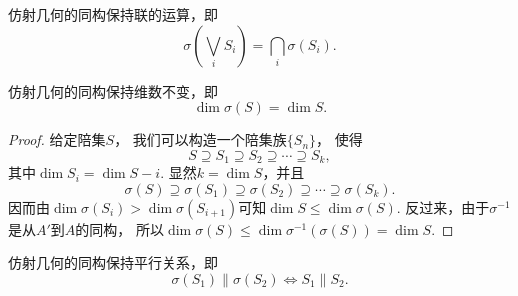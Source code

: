 \begin{property}
仿射几何的同构保持联的运算，即\begin{equation*}
	\sigma\left( \bigvee_i S_i \right)
	= \bigcap_i \sigma(S_i).
\end{equation*}
\end{property}

\begin{property}
仿射几何的同构保持维数不变，即\begin{equation*}
	\dim\sigma(S) = \dim S.
\end{equation*}
\begin{proof}
给定陪集\(S\)，
我们可以构造一个陪集族\(\{S_n\}\)，
使得\begin{equation}
	S \supseteq S_1 \supseteq S_2 \supseteq \dotsb \supseteq S_k,
\end{equation}
其中\(\dim S_i = \dim S - i\).
显然\(k = \dim S\)，并且\begin{equation*}
	\sigma(S) \supseteq \sigma(S_1) \supseteq \sigma(S_2) \supseteq \dotsb \supseteq \sigma(S_k).
\end{equation*}
因而由\(\dim \sigma(S_i) > \dim \sigma(S_{i+1})\)可知\(\dim S \leq \dim \sigma(S)\).
反过来，由于\(\sigma^{-1}\)是从\(A'\)到\(A\)的同构，
所以\(
	\dim \sigma(S) \leq \dim \sigma^{-1}(\sigma(S)) = \dim S.
\)
\end{proof}
\end{property}

\begin{property}
仿射几何的同构保持平行关系，即\begin{equation*}
	\sigma(S_1) \parallel \sigma(S_2)
	\iff
	S_1 \parallel S_2.
\end{equation*}
\end{property}
